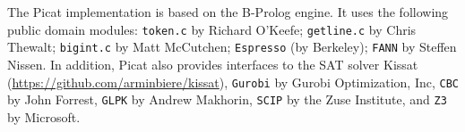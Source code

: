 \documentclass[11pt]{report}
\newcommand{\ignore}[1]{}
\begin{document}
The Picat implementation is based on the B-Prolog engine. It uses the following public domain modules: \ignore{\texttt{prism} by Taisuke Sato and Yoshitaka Kameya; }\texttt{token.c} by Richard O'Keefe; \texttt{getline.c} by Chris Thewalt; \texttt{bigint.c} by Matt McCutchen; \texttt{Espresso} (by Berkeley); \texttt{FANN} by Steffen Nissen. In addition, Picat also provides interfaces to the SAT solver Kissat (\url{https://github.com/arminbiere/kissat}), \texttt{Gurobi} by Gurobi Optimization, Inc, \texttt{CBC} by John Forrest, \texttt{GLPK} by Andrew Makhorin, \texttt{SCIP} by the Zuse Institute, and \texttt{Z3} by Microsoft.

\tableofcontents

\cleardoublepage
\pagestyle{plain}
\setcounter{page}{1}












%
%


%
%








\ignore{}
%



\begin{adjustwidth}{-2cm}{-1cm}

\end{adjustwidth}
\clearpage
{}
{}
\printindex
\end{document}
